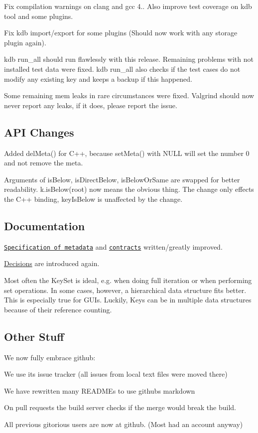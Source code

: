Fix compilation warnings on clang and gcc 4.. Also improve test coverage on kdb tool and some plugins.

Fix kdb import/export for some plugins (Should now work with any storage plugin again).

kdb run\+\_\+all should run flawlessly with this release. Remaining problems with not installed test data were fixed. kdb run\+\_\+all also checks if the test cases do not modify any existing key and keeps a backup if this happened.

Some remaining mem leaks in rare circumstances were fixed. Valgrind should now never report any leaks, if it does, please report the issue.

\subsection*{A\+PI Changes}

Added del\+Meta() for C++, because set\+Meta() with N\+U\+LL will set the number 0 and not remove the meta.

Arguments of is\+Below, is\+Direct\+Below, is\+Below\+Or\+Same are swapped for better readability. k.\+is\+Below(root) now means the obvious thing. The change only effects the C++ binding, key\+Is\+Below is unaffected by the change.

\subsection*{Documentation}

\href{/home/markus/Projekte/Elektra/current/doc/METADATA.ini}{\tt Specification of metadata} and \href{/home/markus/Projekte/Elektra/current/doc/CONTRACT.ini}{\tt contracts} written/greatly improved.

\hyperlink{doc_decisions_README_md}{Decisions} are introduced again.

Most often the Key\+Set is ideal, e.\+g. when doing full iteration or when performing set operations. In some cases, however, a hierarchical data structure fits better. This is especially true for G\+U\+Is. Luckily, Keys can be in multiple data structures because of their reference counting.

\subsection*{Other Stuff}

We now fully embrace github\+:
\begin{DoxyItemize}
\item We use its issue tracker (all issues from local text files were moved there)
\item We have rewritten many R\+E\+A\+D\+M\+Es to use githubs markdown
\item On pull requests the build server checks if the merge would break the build.
\item All previous gitorious users are now at github. (Most had an account anyway)
\end{DoxyItemize}

